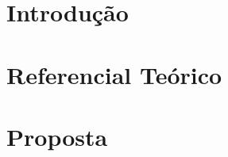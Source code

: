 \documentclass[
	12pt,				%
	openright,			%
	oneside,			%
	a4paper,			%
	chapter=TITLE,		%
	english,			%
	french,				%
	spanish,			%
	brazil				%
	]{abntex2}
\newif\ifisTipoDocumento
\begin{document}



\tableofcontents*
\cleardoublepage


\textual

\chapter[Introdução]{Introdução}



\chapter[Referencial Teórico]{Referencial Teórico}



\ifisTipoDocumento
\chapter[Metodologia e etapas de desenvolvimento]{Metodologia e etapas de desenvolvimento}

\else
\chapter[Proposta]{Proposta}

\fi

\end{document}
